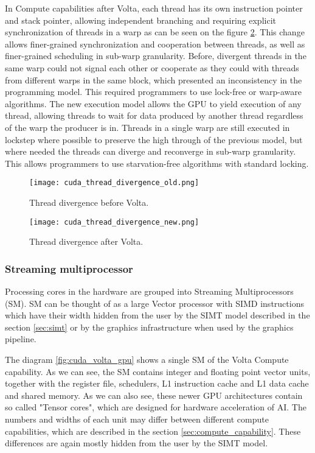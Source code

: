 In Compute capabilities after Volta, each thread has its own instruction pointer and stack pointer, allowing independent branching and requiring explicit synchronization of threads in a warp as can be seen on the figure \ref{fig:thread_divergence_new}. This change allows finer-grained synchronization and cooperation between threads, as well as finer-grained scheduling in sub-warp granularity. Before, divergent threads in the same warp could not signal each other or cooperate as they could with threads from different warps in the same block, which presented an inconsistency in the programming model. This required programmers to use lock-free or warp-aware algorithms.
The new execution model allows the GPU to yield execution of any thread, allowing threads to wait for data produced by another thread regardless of the warp the producer is in. Threads in a single warp are still executed in lockstep where possible to preserve the high through of the previous model, but where needed the threads can diverge and reconverge in sub-warp granularity. This allows programmers to use starvation-free algorithms with standard locking.

\begin{figure}[h]
	\centering
	\texttt{[image: cuda\_thread\_divergence\_old.png]}
	\caption{Thread divergence before Volta.}
	\label{fig:thread_divergence_old}
\end{figure}

\begin{figure}[h]
	\centering
	\texttt{[image: cuda\_thread\_divergence\_new.png]}
	\caption{Thread divergence after Volta.}
	\label{fig:thread_divergence_new}
\end{figure}



\subsubsection{Streaming multiprocessor}
\label{sec:sm}
Processing cores in the hardware are grouped into Streaming Multiprocessors (SM). SM can be thought of as a large Vector processor with SIMD instructions which have their width hidden from the user by the SIMT model described in the section \ref{sec:simt} or by the graphics infrastructure when used by the graphics pipeline.

The diagram \ref{fig:cuda_volta_gpu} shows a single SM of the Volta Compute capability. As we can see, the SM contains integer and floating point vector units, together with the register file, schedulers, L1 instruction cache and L1 data cache and shared memory. As we can also see, these newer GPU architectures contain so called "Tensor cores", which are designed for hardware acceleration of AI. The numbers and widths of each unit may differ between different compute capabilities, which are described in the section \ref{sec:compute_capability}. These differences are again mostly hidden from the user by the SIMT model.

